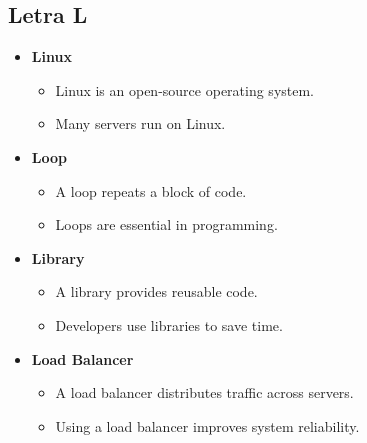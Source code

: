     \subsection{Letra L}
    \begin{itemize}
        \item \textbf{Linux}
        \begin{itemize}
            \item Linux is an open-source operating system.
            \item Many servers run on Linux.
        \end{itemize}
        \item \textbf{Loop}
        \begin{itemize}
            \item A loop repeats a block of code.
            \item Loops are essential in programming.
        \end{itemize}
        \item \textbf{Library}
        \begin{itemize}
            \item A library provides reusable code.
            \item Developers use libraries to save time.
        \end{itemize}
        \item \textbf{Load Balancer}
        \begin{itemize}
            \item A load balancer distributes traffic across servers.
            \item Using a load balancer improves system reliability.
        \end{itemize}
    \end{itemize}
